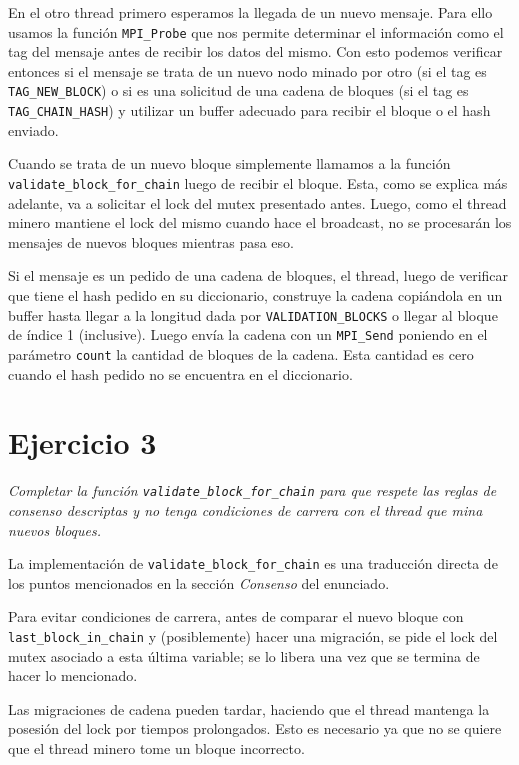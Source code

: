 En el otro thread primero esperamos la llegada de un nuevo mensaje. Para ello usamos la función \texttt{MPI\_Probe} que nos permite determinar el información como el tag del mensaje antes de recibir los datos del mismo. Con esto podemos verificar entonces si el mensaje se trata de un nuevo nodo minado por otro (si el tag es \texttt{TAG\_NEW\_BLOCK}) o si es una solicitud de una cadena de bloques (si el tag es \texttt{TAG\_CHAIN\_HASH}) y utilizar un buffer adecuado para recibir el bloque o el hash enviado.

Cuando se trata de un nuevo bloque simplemente llamamos a la función \texttt{validate\_block\_for\_chain} luego de recibir el bloque. Esta, como se explica más adelante, va a solicitar el lock del mutex presentado antes. Luego, como el thread minero mantiene el lock del mismo cuando hace el broadcast, no se procesarán los mensajes de nuevos bloques mientras pasa eso.

Si el mensaje es un pedido de una cadena de bloques, el thread, luego de verificar que tiene el hash pedido en su diccionario, construye la cadena copiándola en un buffer hasta llegar a la longitud dada por \texttt{VALIDATION\_BLOCKS} o llegar al bloque de índice 1 (inclusive). Luego envía la cadena con un \texttt{MPI\_Send} poniendo en el parámetro \texttt{count} la cantidad de bloques de la cadena. Esta cantidad es cero cuando el hash pedido no se encuentra en el diccionario.


\section{Ejercicio 3}

\emph{Completar la función \texttt{validate\_block\_for\_chain} para que respete las reglas de consenso descriptas y no tenga condiciones de carrera con el thread que mina nuevos bloques.}

La implementación de \texttt{validate\_block\_for\_chain} es una traducción directa de los puntos mencionados en la sección \emph{Consenso} del enunciado.

Para evitar condiciones de carrera, antes de comparar el nuevo bloque con \texttt{last\_block\_in\_chain} y (posiblemente) hacer una migración, se pide el lock del mutex asociado a esta última variable; se lo libera una vez que se termina de hacer lo mencionado.

Las migraciones de cadena pueden tardar, haciendo que el thread mantenga la posesión del lock por tiempos prolongados. Esto es necesario ya que no se quiere que el thread minero tome un bloque incorrecto.


